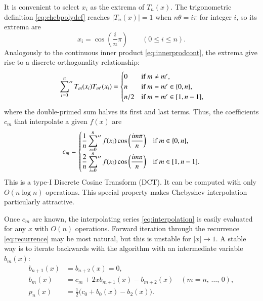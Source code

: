 \documentclass{aa}
\begin{document}
It is convenient to select $x_i$ as the extrema of $T_n(x)$.
The trigonometric definition \eqref{eq:chebpolydef} reaches $\lvert T_n(x) \rvert = 1$ when $n\theta = i\pi$ for integer $i$,
so its extrema are
\begin{equation}
	x_i = \cos \left( \frac{i}{n} \pi \right)
	\qquad
	(0 \leq i \leq n).
\label{eq:chebnodes2_app}
\end{equation}
Analogously to the continuous inner product \eqref{eq:innerprodcont},
the extrema give rise to a discrete orthogonality relationship:
\begin{equation}
	\sideset{}{''}\sum_{i=0}^n T_m(x_i) T_{m'}(x_i) =
	\begin{cases} 0 & \text{if $m \neq m'$,} \\ n & \text{if $m = m' \in \{0, n\}$,} \\ n/2 & \text{if $m = m' \in [1,n-1]$,} \end{cases}
\label{eq:innerproddiscrete}
\end{equation}
where the double-primed sum halves its first and last terms.
Thus, the coefficients $c_m$ that interpolate a given $f(x)$ are%
\begin{equation}
	c_m = \begin{cases}
		\displaystyle \frac{1}{n} \sideset{}{''}\sum_{i=0}^n f(x_i) \cos \left( \frac{im\pi}{n} \right) & \text{if $m \in \{0, n\}$}, \\
		\displaystyle \frac{2}{n} \sideset{}{''}\sum_{i=0}^n f(x_i) \cos \left( \frac{im\pi}{n} \right) & \text{if $m \in [1, n-1]$}.
	\end{cases}
\label{eq:coeffsdiscrete}
\end{equation}
This is a type-I Discrete Cosine Transform (DCT).
It can be computed with only $O(n \log n)$ operations.
This special property makes Chebyshev interpolation particularly attractive.

Once $c_m$ are known, the interpolating series \eqref{eq:interpolation} is easily evaluated for any $x$ with $O(n)$ operations.
Forward iteration through the recurrence \eqref{eq:recurrence} may be most natural, but this is unstable for $\lvert x \rvert \rightarrow 1$.
A stable way is to iterate backwards with the \cite{clenshawNoteSummationChebyshev1955} algorithm with an intermediate variable $b_m(x)$:%
\begin{subequations}
\begin{align}
	b_{n+1}(x) &= b_{n+2}(x) = 0, \\
	b_m(x) &= c_m + 2x b_{m+1}(x) - b_{m+2}(x) \quad (m = n,\, \ldots,\, 0), \\
	p_n(x) &= \textstyle{\frac12 \big(c_0 + b_0(x) - b_2(x)\big)}.
\end{align}
\end{subequations}
\end{document}
